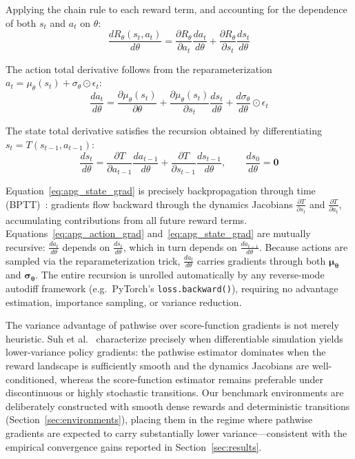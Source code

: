 \documentclass[11pt,a4paper]{article}
\newcommand{\btheta}{\bm{\theta}}
\newcommand{\bmu}{\bm{\mu}}
\newcommand{\bsigma}{\bm{\sigma}}
\begin{document}
Applying the chain rule to each reward term, and accounting for the dependence of both $s_t$ and $a_t$ on $\theta$:
\begin{equation}
  \frac{d R_{\theta}(s_t, a_t)}{d \theta}
  =
  \frac{\partial R_{\theta}}{\partial a_t}\frac{d a_t}{d \theta}
  + \frac{\partial R_{\theta}}{\partial s_t}\frac{d s_t}{d \theta}
  \label{eq:apg_chain}
\end{equation}

The action total derivative follows from the reparameterization $a_t = \mu_\theta(s_t) + \sigma_\theta \odot \epsilon_t$:
\begin{equation}
  \frac{d a_t}{d \theta}
  = \frac{\partial \mu_{\theta}(s_t)}{\partial \theta}
  + \frac{\partial \mu_{\theta}(s_t)}{\partial s_t}\frac{d s_t}{d \theta}
  + \frac{d \sigma_{\theta}}{d \theta} \odot \epsilon_t
  \label{eq:apg_action_grad}
\end{equation}

The state total derivative satisfies the recursion obtained by differentiating $s_t = T(s_{t-1}, a_{t-1})$:
\begin{equation}
  \frac{d s_t}{d \theta}
  =
  \frac{\partial T}{\partial a_{t-1}}\frac{d a_{t-1}}{d \theta}
  + \frac{\partial T}{\partial s_{t-1}}\frac{d s_{t-1}}{d \theta}, \qquad
  \frac{d s_0}{d \theta} = \mathbf{0}
  \label{eq:apg_state_grad}
\end{equation}

Equation~\eqref{eq:apg_state_grad} is precisely backpropagation through time (BPTT)~\cite{werbos1990bptt}: gradients flow backward through the dynamics Jacobians $\tfrac{\partial T}{\partial s_t}$ and $\tfrac{\partial T}{\partial a_t}$, accumulating contributions from all future reward terms. Equations~\eqref{eq:apg_action_grad} and~\eqref{eq:apg_state_grad} are mutually recursive: $\tfrac{d a_t}{d\theta}$ depends on $\tfrac{d s_t}{d\theta}$, which in turn depends on $\tfrac{d a_{t-1}}{d\theta}$. Because actions are sampled via the reparameterization trick, $\tfrac{d a_t}{d\theta}$ carries gradients through both $\bmu_{\btheta}$ and $\bsigma_{\btheta}$. The entire recursion is unrolled automatically by any reverse-mode autodiff framework (e.g.\ PyTorch's \texttt{loss.backward()}), requiring no advantage estimation, importance sampling, or variance reduction.

The variance advantage of pathwise over score-function gradients is not merely heuristic. Suh et al.~\cite{suh2022differentiable} characterize precisely when differentiable simulation yields lower-variance policy gradients: the pathwise estimator dominates when the reward landscape is sufficiently smooth and the dynamics Jacobians are well-conditioned, whereas the score-function estimator remains preferable under discontinuous or highly stochastic transitions. Our benchmark environments are deliberately constructed with smooth dense rewards and deterministic transitions (Section~\ref{sec:environments}), placing them in the regime where pathwise gradients are expected to carry substantially lower variance---consistent with the empirical convergence gains reported in Section~\ref{sec:results}.
\end{document}
